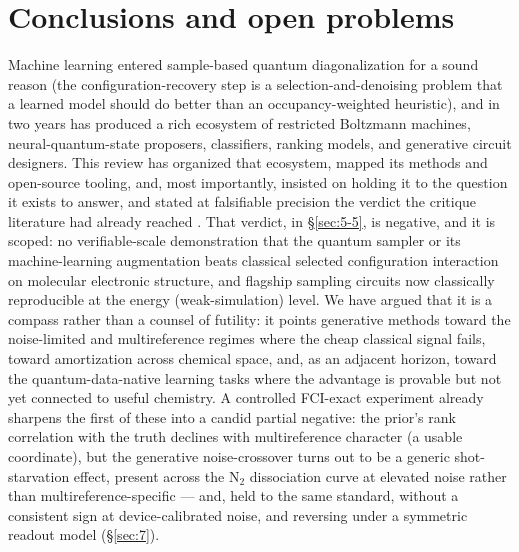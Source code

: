 \documentclass[onecolumn,a4paper]{quantumarticle}
\begin{document}
\section{Conclusions and open problems}\label{sec:8}

Machine learning entered sample-based quantum diagonalization for a sound reason (the configuration-recovery step is a selection-and-denoising problem that a learned model should do better than an occupancy-weighted heuristic), and in two years has produced a rich ecosystem of restricted Boltzmann machines, neural-quantum-state proposers, classifiers, ranking models, and generative circuit designers. This review has organized that ecosystem, mapped its methods and open-source tooling, and, most importantly, insisted on holding it to the question it exists to answer, and stated at falsifiable precision the verdict the critique literature had already reached \cite{reinholdt2025}. That verdict, in \S\ref{sec:5-5}, is negative, and it is scoped: no verifiable-scale demonstration that the quantum sampler or its machine-learning augmentation beats classical selected configuration interaction on molecular electronic structure, and flagship sampling circuits now classically reproducible at the energy (weak-simulation) level. We have argued that it is a compass rather than a counsel of futility: it points generative methods toward the noise-limited and multireference regimes where the cheap classical signal fails, toward amortization across chemical space, and, as an adjacent horizon, toward the quantum-data-native learning tasks where the advantage is provable but not yet connected to useful chemistry. A controlled FCI-exact experiment already sharpens the first of these into a candid partial negative: the prior's rank correlation with the truth declines with multireference character (a usable coordinate), but the generative noise-crossover turns out to be a generic shot-starvation effect, present across the N$_2$ dissociation curve at elevated noise rather than multireference-specific --- and, held to the same standard, without a consistent sign at device-calibrated noise, and reversing under a symmetric readout model (\S\ref{sec:7}).
\end{document}
